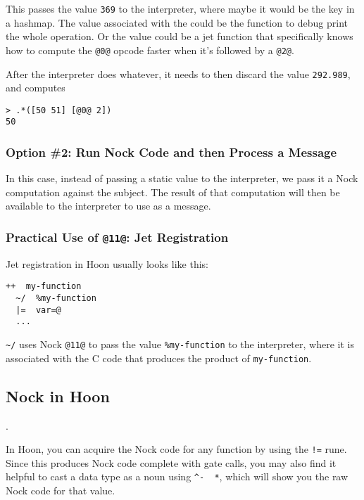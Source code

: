 \documentclass[twoside]{article}
\begin{document}
\noindent{}
This passes the value \lstinline[style=inlinecode]{369} to the interpreter, where maybe it would be the key in a hashmap. The value associated with the could be the function to debug print the whole operation. Or the value could be a jet function that specifically knows how to compute the \lstinline[style=inlinecode]{@0@} opcode faster when it's followed by a \lstinline[style=inlinecode]{@2@}.

After the interpreter does whatever, it needs to then discard the value \lstinline[style=inlinecode]{292.989}, and computes

\begin{lstlisting}[style=listingcode]
> .*([50 51] [@0@ 2])
50
\end{lstlisting}

\subsubsection{Option \#2: Run Nock Code and then Process a Message}

In this case, instead of passing a static value to the interpreter, we pass it a Nock computation against the subject. The result of that computation will then be available to the interpreter to use as a message.

\subsubsection{Practical Use of \lstinline[style=inlinecode]{@11@}: Jet Registration}

Jet registration in Hoon usually looks like this:

\begin{lstlisting}[style=listingcode]
++  my-function
  ~/  %my-function
  |=  var=@
  ...
\end{lstlisting}

\lstinline[style=inlinecode]{~/} uses Nock \lstinline[style=inlinecode]{@11@} to pass the value \lstinline[style=inlinecode]{%my-function} to the interpreter, where it is associated with the C code that produces the product of \lstinline[style=inlinecode]{my-function}.

\subsection{Nock in Hoon}.

In Hoon, you can acquire the Nock code for any function by using the \lstinline[style=inlinecode]{!=} rune.  Since this produces Nock code complete with gate calls, you may also find it helpful to cast a data type as a noun using \lstinline[style=inlinecode]{^-  *}, which will show you the raw Nock code for that value.
\end{document}
